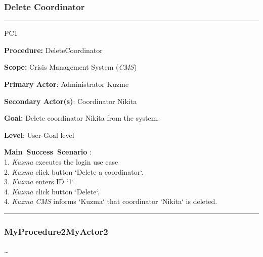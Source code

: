 \subsubsection{Delete Coordinator}
\vspace{0.5cm}
\hrule
\begin{lyxlist}{PC1}
\small{
\item [\textbf{Procedure:}] DeleteCoordinator
\item [\textbf{Scope:}] Crisis Management System (\emph{CMS})
\item [\textbf{Primary Actor}:] Administrator Kuzme
\item [\textbf{Secondary Actor(s)}:] Coordinator Nikita
\item [\textbf{Goal:}] Delete coordinator Nikita from the system.
\item [\textbf{Level}:] User-Goal level
\item [\textbf{Main~Success~Scenario}]:\\
1. \emph{Kuzma} executes the login use case\\
2. \emph{Kuzma} click button `Delete a coordinator`.\\
3. \emph{Kuzma} enters ID `1`. \\
4. \emph{Kuzma} click button `Delete`. \\
4. \emph{Kuzma} \emph{CMS} informs `Kuzma` that coordinator `Nikita` is deleted. 
}

\end{lyxlist}
\hrule
\vspace{0.5cm}

\subsubsection{MyProcedure2MyActor2}
\ldots












